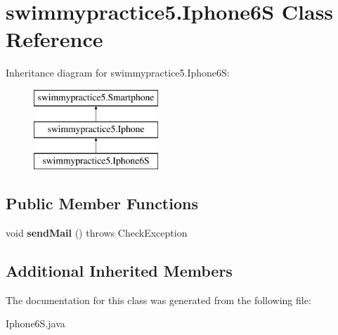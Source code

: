 \hypertarget{classswimmypractice5_1_1_iphone6_s}{}\section{swimmypractice5.\+Iphone6S Class Reference}
\label{classswimmypractice5_1_1_iphone6_s}
Inheritance diagram for swimmypractice5.\+Iphone6S\+:\begin{figure}[H]
\begin{center}
\leavevmode
\includegraphics[height=3.000000cm]{classswimmypractice5_1_1_iphone6_s}
\end{center}
\end{figure}
\subsection*{Public Member Functions}
\begin{DoxyCompactItemize}
\item 
\mbox{\label{classswimmypractice5_1_1_iphone6_s_a6bfff10d4ae15856a03dddb10dcb4cfd}} 
void {\bfseries send\+Mail} ()  throws Check\+Exception
\end{DoxyCompactItemize}
\subsection*{Additional Inherited Members}


The documentation for this class was generated from the following file\+:\begin{DoxyCompactItemize}
\item 
Iphone6\+S.\+java\end{DoxyCompactItemize}
